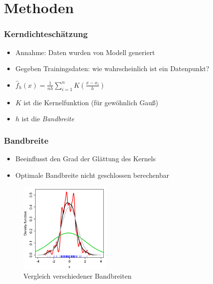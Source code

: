 \section{Methoden}

\begin{frame}
	\frametitle{Kerndichteschätzung}
	
	\begin{itemize}
		\item Annahme: Daten wurden von Modell generiert
		\item Gegeben Trainingsdaten: wie wahrscheinlich ist ein Datenpunkt?
		\item $\hat{f}_h(x) = \frac{1}{nh}\sum_{i=1}^{n} K(\frac{x - x_i}{h})$
		\item $K$ ist die Kernelfunktion (f\"ur gew\"ohnlich Gau{\ss})
		\item $h$ ist die \textit{Bandbreite}
	\end{itemize}
\end{frame}

\begin{frame}
	\frametitle{Bandbreite}
	
	\begin{itemize}
		\item Beeinflusst den Grad der Gl\"attung des Kernels
		\item Optimale Bandbreite nicht geschlossen berechenbar
	\end{itemize}
	
	\begin{figure}[p]
		\centering
		\includegraphics[width=0.4\textwidth]{figures/Bandwidth_comparison.png}
		\caption{Vergleich verschiedener Bandbreiten}
		\label{fig:bandwidth}
	\end{figure}
\end{frame}

